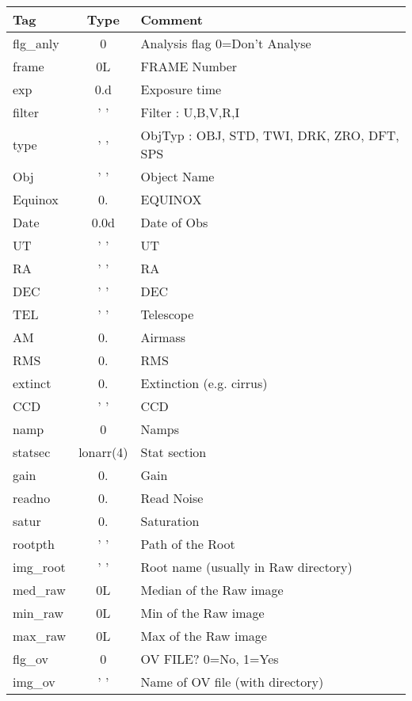 \documentclass[11pt,letterpaper,dvips]{article}
\begin{document}
\begin{enumerate}
\begin{Aenumerate}
	{\small
	\begin{tabular}{lcl}
	  \hline
	  Tag & Type & Comment \\
	  \hline
          flg\_anly & 0 &       Analysis flag 0=Don't Analyse \\
          frame & 0L &         FRAME Number \\
          exp & 0.d &          Exposure time \\
          filter & ' ' &       Filter : U,B,V,R,I \\
          type & ' ' &         ObjTyp : OBJ, STD, TWI, DRK, ZRO, DFT, SPS \\
          Obj & ' ' &          Object Name \\
          Equinox & 0. &       EQUINOX \\
          Date & 0.0d &        Date of Obs \\
          UT & ' ' &           UT \\
          RA & ' ' &           RA \\
          DEC & ' ' &          DEC \\
          TEL & ' ' &          Telescope \\
          AM &   0. &          Airmass \\
          RMS &   0. &         RMS \\
          extinct &   0. &     Extinction (e.g. cirrus) \\
          CCD & ' ' &          CCD \\
          namp & 0 &           Namps \\
          statsec & lonarr(4) &    Stat section \\
          gain & 0. &          Gain \\
          readno & 0. &        Read Noise \\
          satur  & 0. &        Saturation \\
          rootpth & ' ' &      Path of the Root \\
          img\_root & ' ' &    Root name (usually in Raw directory) \\
          med\_raw & 0L &      Median of the Raw image \\
          min\_raw & 0L &      Min of the Raw image \\
          max\_raw & 0L &      Max of the Raw image \\
          flg\_ov &  0 &       OV FILE?  0=No, 1=Yes   \\
          img\_ov &  ' ' &     Name of OV file (with directory) \\

\end{tabular}}
\end{Aenumerate}
\end{enumerate}
\end{document}
